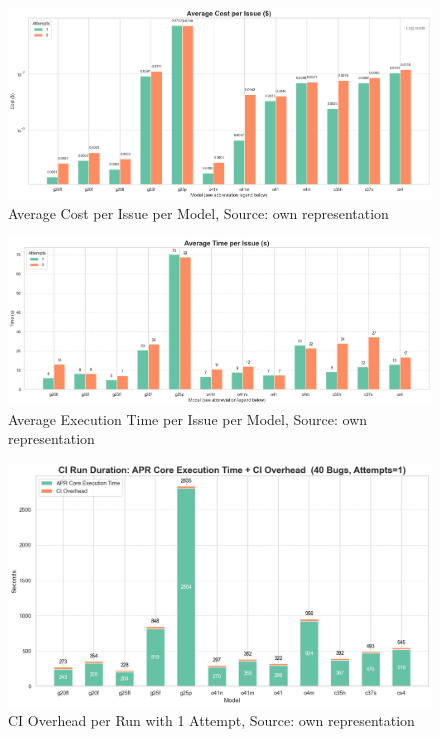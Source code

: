 \begin{figure}[H]
    \centering
    \includegraphics[width=1\textwidth]{images/diagrams/avg_cost_per_issue_per_model_grouped.png}
    \caption{Average Cost per Issue per Model, Source: own representation}
    \label{fig:avg-cost-per-issue}
\end{figure}

\begin{figure}[H]
    \centering
    \includegraphics[width=1\textwidth]{images/diagrams/avg_execution_time_per_issue_per_model_grouped.png}
    \caption{Average Execution Time per Issue per Model, Source: own representation}
    \label{fig:avg-execution-time-per-issue}
\end{figure}

\begin{figure}[H]
    \centering
    \includegraphics[width=1\textwidth]{images/diagrams/ci_vs_exec_time_per_run_stacked_attempts_1.png}
    \caption{CI Overhead per Run with 1 Attempt, Source: own representation}
    \label{fig:ci-vs-exec-time-per-run-attempts-1}
\end{figure}

